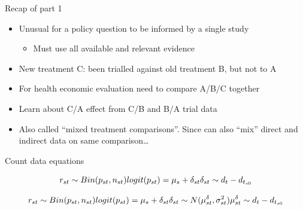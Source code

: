 \documentclass[
  ignorenonframetext,
]{beamer}
\providecommand{\tightlist}{%
  \setlength{\itemsep}{0pt}\setlength{\parskip}{0pt}}\usepackage{longtable,booktabs,array}
\begin{document}
\begin{frame}{Recap of part 1}
\protect\hypertarget{recap-of-part-1}{}
\begin{itemize}
\tightlist
\item
  Unusual for a policy question to be informed by a single study

  \begin{itemize}
  \tightlist
  \item
    Must use all available and relevant evidence
  \end{itemize}
\end{itemize}

\begin{itemize}[<+->]
\item
  New treatment C: been trialled against old treatment B, but not to A
\item
  For health economic evaluation need to compare A/B/C together
\item
  Learn about C/A effect from C/B and B/A trial data
\item
  Also called ``mixed treatment comparisons''. Since can also ``mix''
  direct and indirect data on same comparison\ldots{}
\end{itemize}
\end{frame}

\begin{frame}{Count data equations}
\protect\hypertarget{count-data-equations}{}
\begin{tcolorbox}[enhanced jigsaw, toprule=.15mm, titlerule=0mm, colback=white, arc=.35mm, opacitybacktitle=0.6, coltitle=black, title={Fixed effects}, breakable, toptitle=1mm, leftrule=.75mm, bottomtitle=1mm, rightrule=.15mm, opacityback=0, colframe=quarto-callout-note-color-frame, colbacktitle=quarto-callout-note-color!10!white, left=2mm, bottomrule=.15mm]

\[
r_{st} \sim Bin(p_{st}, n_{st})\\
logit(p_{st}) = \mu_s + \delta_{st}\\
\delta_{st} \sim d_t - d_{t_{s0}}
\]

\end{tcolorbox}

\begin{tcolorbox}[enhanced jigsaw, toprule=.15mm, titlerule=0mm, colback=white, arc=.35mm, opacitybacktitle=0.6, coltitle=black, title={Random effects}, breakable, toptitle=1mm, leftrule=.75mm, bottomtitle=1mm, rightrule=.15mm, opacityback=0, colframe=quarto-callout-note-color-frame, colbacktitle=quarto-callout-note-color!10!white, left=2mm, bottomrule=.15mm]

\[
r_{st} \sim Bin(p_{st}, n_{st})\\
logit(p_{st}) = \mu_s + \delta_{st}\\
\delta_{st} \sim N(\mu^{\delta}_{st}, \sigma^2_{st})\\
\mu^{\delta}_{st} \sim d_t - d_{t_{s0}}
\]

\end{tcolorbox}
\end{frame}
\end{document}
